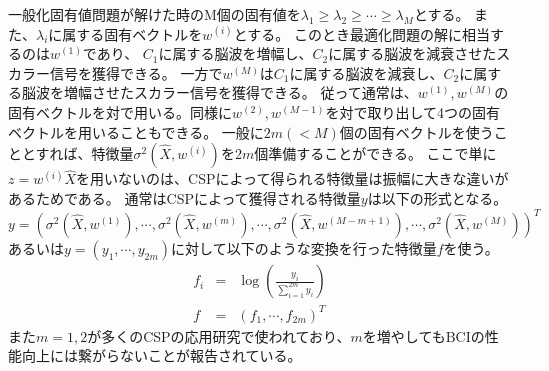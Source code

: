 一般化固有値問題が解けた時のM個の固有値を\(\lambda_1 \geq \lambda_2 \geq \cdots \geq \lambda_M\)とする。
また、\(\lambda_i\)に属する固有ベクトルを\(w^{(i)}\)とする。
このとき最適化問題の解に相当するのは\(w^{(1)}\)であり、
\(C_1\)に属する脳波を増幅し、\(C_2\)に属する脳波を減衰させたスカラー信号を獲得できる。
一方で\(w^{(M)}\)は\(C_1\)に属する脳波を減衰し、\(C_2\)に属する脳波を増幅させたスカラー信号を獲得できる。
従って通常は、\(w^{(1)},w^{(M)}\)の固有ベクトルを対で用いる。同様に\(w^{(2)},w^{(M-1)}\)を対で取り出して4つの固有ベクトルを用いることもできる。
一般に\(2m(<M)\)個の固有ベクトルを使うこととすれば、特徴量\(\sigma^2(\hat X,w^{(i)})\)を\(2m\)個準備することができる。
ここで単に\(z=w^{(i)}\hat X\)を用いないのは、CSPによって得られる特徴量は振幅に大きな違いがあるためである。
通常はCSPによって獲得される特徴量\(y\)は以下の形式となる。
\begin{equation}
    y = (\sigma^2(\hat X,w^{(1)}), \cdots, \sigma^2(\hat X,w^{(m)}), \cdots, \sigma^2(\hat X,w^{(M-m+1)}), \cdots, \sigma^2(\hat X,w^{(M)}))^T
\end{equation}
あるいは\(y=(y_1, \cdots, y_{2m})\)に対して以下のような変換を行った特徴量\(f\)を使う。
\begin{eqnarray}
    f_i &=& \log \left( \frac{y_i}{\sum_{i=1}^{2m}y_i} \right) \nonumber \\
    f &=& (f_1, \cdots, f_{2m})^T 
\end{eqnarray}
また\(m=1,2\)が多くのCSPの応用研究で使われており、\(m\)を増やしてもBCIの性能向上には繋がらないことが報告されている\cite{cvscsp}。

